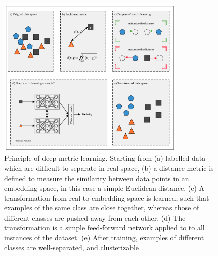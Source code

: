 \begin{figure}[h!]
    \centering
    \includegraphics[width=0.8\textwidth]{figures/metric-learning-illustration.png}
    \caption{Principle of deep metric learning. Starting from (a) labelled data which are difficult to separate in real space, (b) a distance metric is defined to measure the similarity between data points in an embedding space, in this case a simple Euclidean distance. (c) A transformation from real to embedding space is learned, such that examples of the same class are close together, whereas those of different classes are pushed away from each other. (d) The transformation is a simple feed-forward network applied to to all instances of the dataset. (e) After training, examples of different classes are well-separated, and clusterizable \cite{metric-learning-rev2}.}
    \label{fig:metric-learning-illus}
\end{figure}


